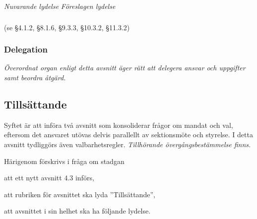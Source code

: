 \documentclass{article}
\newenvironment{lydelse}
    {\begin{paracol}{2}%
        \emph{Nuvarande lydelse}%
        \switchcolumn%
        \emph{Föreslagen lydelse}%
    \end{paracol}%
    \begin{enumerate}[label=\thesubsection.\arabic*]%
    \begin{paracol}{2}%
    }{\end{paracol}\end{enumerate}}
\begin{document}
\begin{lydelse}
  \switchcolumn*
    \subsubsection*{}
    \item[] (se \S 4.1.2, \S 8.1.6, \S 9.3.3, \S 10.3.2, \S 11.3.2)

  \switchcolumn
    \subsubsection*{Delegation} 
    \item \emph{Överordnat organ enligt detta avsnitt äger rätt att delegera ansvar och uppgifter samt beordra åtgärd.} 
      \label{4.x:delegation}
  
\end{lydelse}

\subsection{Tillsättande} \label{4.x:tillsättande}
Syftet är att införa två avsnitt som konsoliderar frågor om mandat och val, eftersom det ansvaret utövas delvis parallellt av sektionsmöte och styrelse.
I detta avsnitt tydliggörs även valbarhetsregler.
\emph{Tillhörande övergångsbestämmelse finns.}

Härigenom förskrivs i fråga om stadgan
\begin{dels}
    \item att ett nytt avsnitt 4.3 införs,
    \item att rubriken för avsnittet ska lyda ''Tillsättande'',
    \item att avsnittet i sin helhet ska ha följande lydelse.
\end{dels}
\end{document}
